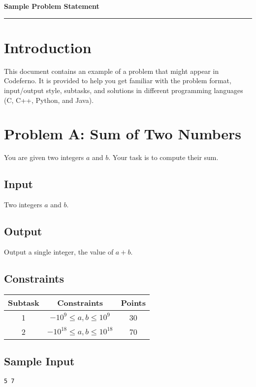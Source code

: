 \documentclass[12pt,a4paper]{article}
\begin{document}
\begin{center}
    {\LARGE \textbf{Sample Problem Statement}} \\[0.5em]
    \rule{\textwidth}{0.4pt}
\end{center}

\vspace{1em}

\section*{Introduction}
This document contains an example of a problem that might appear in Codeferno.  
It is provided to help you get familiar with the problem format, input/output style, subtasks, and solutions in different programming languages (C, C++, Python, and Java).  

\section*{Problem A: Sum of Two Numbers}
You are given two integers $a$ and $b$. Your task is to compute their sum.

\subsection*{Input}
Two integers $a$ and $b$.

\subsection*{Output}
Output a single integer, the value of $a+b$.

\subsection*{Constraints}
\begin{tabular}{|c|c|c|}
\hline
\textbf{Subtask} & \textbf{Constraints} & \textbf{Points} \\
\hline
1 & $-10^9 \leq a, b \leq 10^9$ & 30 \\
\hline
2 & $-10^{18} \leq a, b \leq 10^{18}$ & 70 \\
\hline
\end{tabular}

\subsection*{Sample Input}
\begin{verbatim}
5 7
\end{verbatim}
\end{document}
